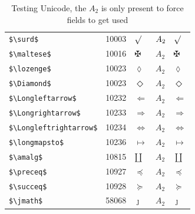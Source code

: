 ﻿\documentclass{article}
\begin{document}
\begin{table}
\begin{center}
\begin{tabular}{llll}
 \verb#$\surd$#               & 10003   & $\surd$               & $A_2\quad \surd$\\
 \verb#$\maltese$#            & 10016   & $\maltese$            & $A_2\quad \maltese$\\
 \verb#$\lozenge$#            & 10023   & $\lozenge$            & $A_2\quad \lozenge$\\
 \verb#$\Diamond$#            & 10023   & $\Diamond$            & $A_2\quad \Diamond$\\
 \verb#$\Longleftarrow$#      & 10232   & $\Longleftarrow$      & $A_2\quad \Longleftarrow$\\
 \verb#$\Longrightarrow$#     & 10233   & $\Longrightarrow$     & $A_2\quad \Longrightarrow$\\
 \verb#$\Longleftrightarrow$# & 10234   & $\Longleftrightarrow$ & $A_2\quad \Longleftrightarrow$\\
 \verb#$\longmapsto$#         & 10236   & $\longmapsto$         & $A_2\quad \longmapsto$\\
 \verb#$\amalg$#              & 10815   & $\amalg$              & $A_2\quad \amalg$\\
 \verb#$\preceq$#             & 10927   & $\preceq$             & $A_2\quad \preceq$\\
 \verb#$\succeq$#             & 10928   & $\succeq$             & $A_2\quad \succeq$\\
 \verb#$\jmath$#              & 58068   & $\jmath$              & $A_2\quad \jmath$\\
\end{tabular}
\end{center}
\caption{Testing Unicode, the $A_2$ is only present to force fields to get used}
\end{table}
\end{document}
